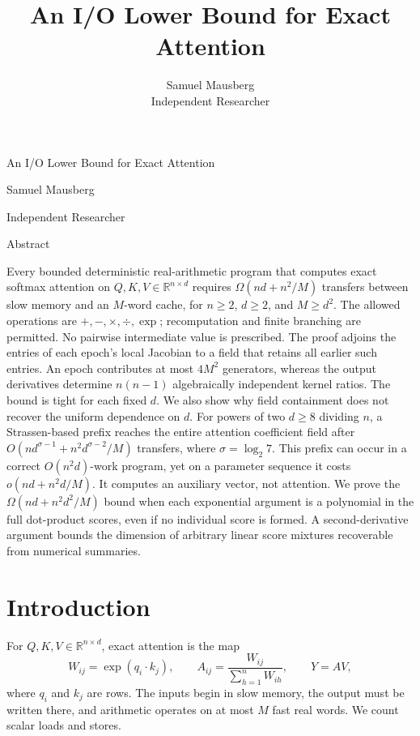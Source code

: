 \documentclass[11pt]{article}
\title{An I/O Lower Bound for Exact Attention}
\author{Samuel Mausberg\\Independent Researcher}
\date{}
\theoremstyle{definition}
\theoremstyle{remark}
\newcommand{\R}{\mathbb R}
\begin{document}
\hypersetup{pageanchor=false}
\begin{titlepage}
\thispagestyle{empty}
\vspace*{0.3in}
\begin{center}
{\LARGE An I/O Lower Bound for Exact Attention\par}
\vspace{0.25in}
{\large Samuel Mausberg\par}
\vspace{0.05in}
Independent Researcher
\end{center}
\vspace{0.35in}
\begin{center}Abstract\end{center}
Every bounded deterministic real-arithmetic program that computes exact
softmax attention on $Q,K,V\in\R^{n\times d}$ requires
$\Omega(nd+n^2/M)$ transfers between slow memory and an $M$-word cache,
for $n\ge2$, $d\ge2$, and $M\ge d^2$. The allowed operations are
$+,-,\times,\div,\exp$; recomputation and finite branching are permitted.
No pairwise intermediate value is prescribed. The proof adjoins the
entries of each epoch's local Jacobian to a field that retains all earlier
such entries. An epoch contributes at most $4M^2$ generators, whereas
the output derivatives determine $n(n-1)$ algebraically independent
kernel ratios. The bound is tight for each fixed $d$. We also show why
field containment does not recover the uniform dependence on $d$.
For powers of two $d\ge8$ dividing $n$, a Strassen-based prefix reaches
the entire attention coefficient field after
$O(nd^{\sigma-1}+n^2d^{\sigma-2}/M)$ transfers, where $\sigma=\log_2 7$.
This prefix can occur in a correct $O(n^2d)$-work program, yet on a
parameter sequence it costs $o(nd+n^2d/M)$. It computes an auxiliary
vector, not attention. We prove the
$\Omega(nd+n^2d^2/M)$ bound when each exponential argument is a polynomial
in the full dot-product scores, even if no individual score is formed.
A second-derivative argument bounds the dimension of arbitrary linear
score mixtures recoverable from numerical summaries.
\end{titlepage}
\hypersetup{pageanchor=true}
\setcounter{page}{1}

\section{Introduction}
For $Q,K,V\in\R^{n\times d}$, exact attention is the map
\begin{equation}
 W_{ij}=\exp(q_i\cdot k_j),\qquad
 A_{ij}=\frac{W_{ij}}{\sum_{h=1}^n W_{ih}},\qquad Y=AV,
 \label{eq:attention}
\end{equation}
where $q_i$ and $k_j$ are rows. The inputs begin in slow memory, the
output must be written there, and arithmetic operates on at most $M$
fast real words. We count scalar loads and stores.
\end{document}
